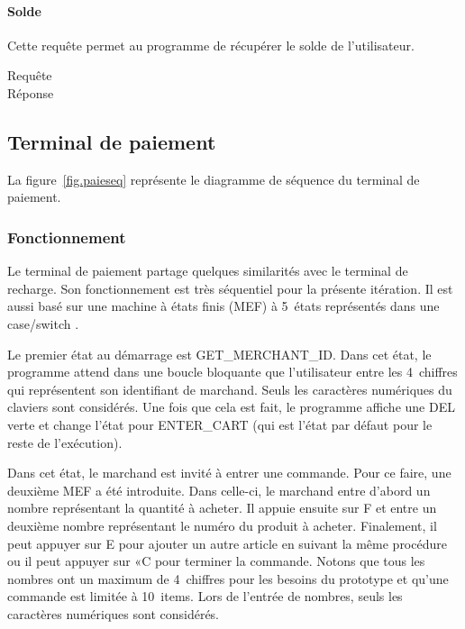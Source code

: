 			\paragraph{Solde} Cette requête permet au programme de récupérer le solde de l’utilisateur.
			\begin{multicols}{2}
				\begin{description}
					\item[Requête]  %

					\item[Réponse]  %
					
				\end{description}
			\end{multicols}
			
	\clearpage
	\subsection{Terminal de paiement}
	La figure~\ref{fig.paieseq} représente le diagramme de séquence du terminal de paiement.
		\subsubsection{Fonctionnement}
		Le terminal de paiement partage quelques similarités avec le terminal de recharge. Son fonctionnement est très séquentiel pour la présente itération. Il est aussi basé sur une machine à états finis (MEF) à 5~états représentés dans une \og case/switch \fg{}.
		
		Le premier état au démarrage est GET\_MERCHANT\_ID. Dans cet état, le programme attend dans une boucle bloquante que l’utilisateur entre les 4~chiffres qui représentent son identifiant de marchand. Seuls les caractères numériques du claviers sont considérés. Une fois que cela est fait, le programme affiche une DEL verte et change l’état pour ENTER\_CART (qui est l’état par défaut pour le reste de l’exécution).

		Dans cet état, le marchand est invité à entrer une commande. Pour ce faire, une deuxième MEF a été introduite. Dans celle-ci, le marchand entre d’abord un nombre représentant la quantité à acheter. Il appuie ensuite sur \og F \fg{} et entre un deuxième nombre représentant le numéro du produit à acheter. Finalement, il peut appuyer sur \og E \fg{} pour ajouter un autre article en suivant la même procédure ou il peut appuyer sur «\og C \fg{} pour terminer la commande. Notons que tous les nombres ont un maximum de 4~chiffres pour les besoins du prototype et qu’une commande est limitée à 10~items. Lors de l’entrée de nombres, seuls les caractères numériques sont considérés.

